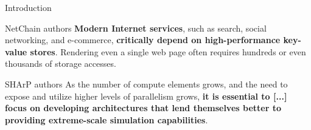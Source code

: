 \begin{frame}[fragile]{Introduction}


    \begin{aquote}{NetChain\footnotemark{} authors}
        \textbf{Modern Internet services}, such as search, social networking, and e-commerce, \textbf{critically depend on high-performance key-value stores}. Rendering even a single web page often requires hundreds or even thousands of storage accesses.
    \end{aquote}

    \vspace{7mm}

    \begin{aquote}{SHArP\footnotemark{} authors}
        As the number of compute elements grows, and the need to expose and utilize higher levels of parallelism grows, \textbf{it is essential to [...] focus on developing architectures that lend themselves better to providing extreme-scale simulation capabilities}.
    \end{aquote}

    \setcounter{footnote}{1}
\end{frame}

